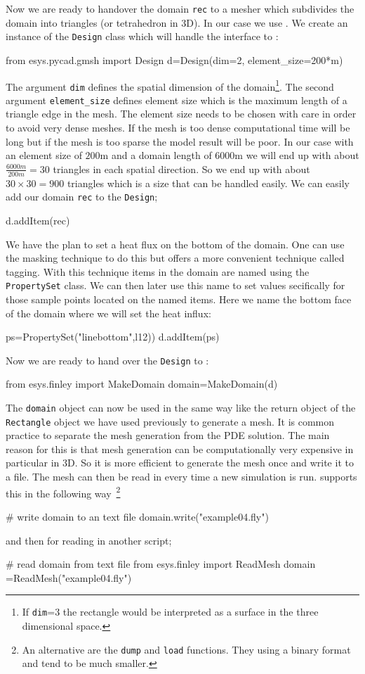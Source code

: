 Now we are ready to handover the domain \verb|rec| to a mesher which subdivides the domain into triangles (or tetrahedron in 3D). In our case we use \gmsh. We create 
an instance of the \verb|Design| class which will handle the interface to \gmsh: 
\begin{python}
from esys.pycad.gmsh import Design 
d=Design(dim=2, element_size=200*m)
\end{python}
The argument \verb|dim| defines the spatial dimension of the domain\footnote{If \texttt{dim}=3 the rectangle would be interpreted as a surface in the three dimensional space.}. The second argument \verb|element_size| defines element size which is the maximum length of a triangle edge in the mesh. The element size needs to be chosen with care in order to avoid very dense meshes. If the mesh is too dense computational time will be long but if the mesh is too sparse the model result will be poor. In our case with an element size of $200$m 
and a domain length of $6000$m we will end up with about $\frac{6000m}{200m}=30$ triangles in each spatial direction. So we end up with about $30 \times 30 = 900$ triangles which is a size that can be handled easily.
We can easily add our domain \verb|rec| to the \verb|Design|;
\begin{python}
d.addItem(rec)
\end{python}
We have the plan to set a heat flux on the bottom of the domain. One can use the masking technique to do this
but \pycad offers a more convenient technique called tagging. With this technique items in the domain are
named using the \verb|PropertySet| class. We can then later use this name to set values secifically for
those sample points located on the named items. Here we name the bottom face of the 
domain where we will set the heat influx:
\begin{python}
ps=PropertySet("linebottom",l12))
d.addItem(ps)
\end{python}
Now we are ready to hand over the \verb|Design| to \FINLEY:
\begin{python}
from esys.finley import MakeDomain
domain=MakeDomain(d)
\end{python}
The \verb|domain| object can now be used in the same way like the return object of the \verb|Rectangle| 
object we have used previously to generate a mesh. It is common practice to separate the 
mesh generation from the PDE solution. The main reason for this is that mesh generation can be computationally very expensive in particular in 3D. So it is more efficient to generate the mesh once and write it to a file. The mesh
can then be read in every time a new simulation is run. \FINLEY supports this in the following 
way~\footnote{An alternative are the \texttt{dump} and \texttt{load} functions. They using a binary format and tend to be much smaller.}
\begin{python}
# write domain to an text file
domain.write("example04.fly")
\end{python}
and then for reading in another script;
\begin{python}
# read domain from text file
from esys.finley import ReadMesh
domain =ReadMesh("example04.fly")
\end{python}


